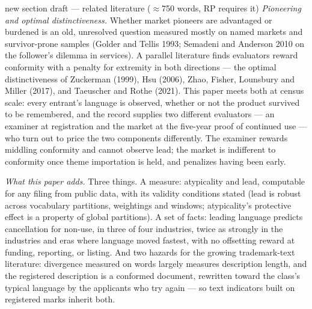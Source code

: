 \begin{ericbox}{new section draft --- related literature ($\approx$750 words, RP requires it)}
\medskip\noindent\emph{Pioneering and optimal distinctiveness.} Whether
market pioneers are advantaged or burdened is an old, unresolved question
measured mostly on named markets and survivor-prone samples (Golder and
Tellis 1993; Semadeni and Anderson 2010 on the follower's dilemma in
services). A parallel literature finds evaluators reward conformity with
a penalty for extremity in both directions --- the optimal
distinctiveness of Zuckerman (1999), Hsu (2006), Zhao, Fisher, Lounsbury
and Miller (2017), and Taeuscher and Rothe (2021). This paper meets both
at census scale: every entrant's language is observed, whether or not the
product survived to be remembered, and the record supplies two different
evaluators --- an examiner at registration and the market at the
five-year proof of continued use --- who turn out to price the two
components differently. The examiner rewards middling conformity and
cannot observe lead; the market is indifferent to conformity once theme
importation is held, and penalizes having been early.

\medskip\noindent\emph{What this paper adds.} Three things. A measure:
atypicality and lead, computable for any filing from public data, with
its validity conditions stated (lead is robust across vocabulary
partitions, weightings and windows; atypicality's protective effect is a
property of global partitions). A set of facts: leading language predicts
cancellation for non-use, in three of four industries, twice as strongly
in the industries and eras where language moved fastest, with no
offsetting reward at funding, reporting, or listing. And two hazards for
the growing trademark-text literature: divergence measured on words
largely measures description length, and the registered description is a
conformed document, rewritten toward the class's typical language by the
applicants who try again --- so text indicators built on registered marks
inherit both.
\end{ericbox}
